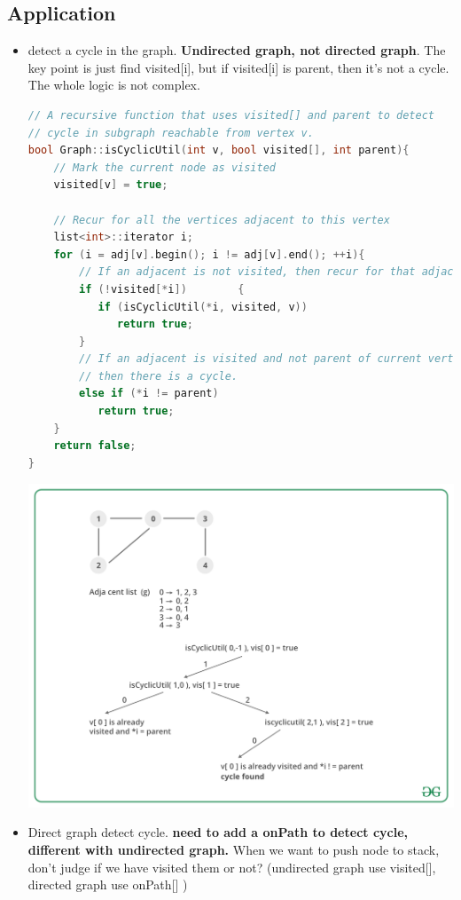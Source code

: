\documentclass[a4paper,11pt,twoside]{book}
\begin{document}
\subsection{Application}
\begin{itemize}
\item detect a cycle in the graph. \textbf{Undirected graph, not directed graph}.  The key point is just find visited[i], but if visited[i] is parent, then it's not a cycle. The whole logic is not complex. 
\begin{lstlisting}[frame=single, language=c++]
// A recursive function that uses visited[] and parent to detect
// cycle in subgraph reachable from vertex v.
bool Graph::isCyclicUtil(int v, bool visited[], int parent){
    // Mark the current node as visited
    visited[v] = true;
 
    // Recur for all the vertices adjacent to this vertex
    list<int>::iterator i;
    for (i = adj[v].begin(); i != adj[v].end(); ++i){
        // If an adjacent is not visited, then recur for that adjacent
        if (!visited[*i])        {
           if (isCyclicUtil(*i, visited, v))
              return true;
        }
        // If an adjacent is visited and not parent of current vertex,
        // then there is a cycle.
        else if (*i != parent)
           return true;
    }
    return false;
}
\end{lstlisting}

\begin{center}
		\includegraphics[width=0.7\linewidth]{pics/dc.png}
\end{center}

	\item Direct graph detect cycle. \textbf{need to add a onPath to detect cycle, different with undirected graph.} When we want to push node to stack, don't judge if we have visited them or not?  (undirected graph use visited[], directed graph use onPath[] )
	

\end{itemize}
\end{document}
